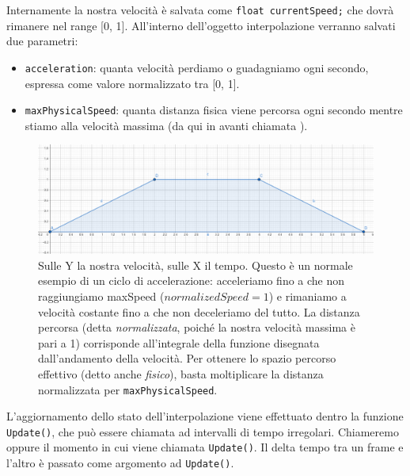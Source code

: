 \documentclass[main.tex]{subfiles}
\begin{document}
Internamente la nostra velocità è salvata come \lstinline{float currentSpeed;} che dovrà rimanere nel range [0, 1]. All'interno dell'oggetto interpolazione verranno salvati due parametri:
\begin{itemize}
    \item \lstinline{acceleration}: quanta velocità perdiamo o guadagniamo ogni secondo, espressa come valore normalizzato tra [0, 1].
    \item \lstinline{maxPhysicalSpeed}: quanta distanza fisica viene percorsa ogni secondo mentre stiamo alla velocità massima (da qui in avanti chiamata ).
\end{itemize}
\begin{figure}[H]
    \centering
    \includegraphics[width=1\linewidth]{img/interpolazione/normalSpeed.png}
    \caption{Sulle Y la nostra velocità, sulle X il tempo. Questo è un normale esempio di un ciclo di accelerazione: acceleriamo fino a che non raggiungiamo maxSpeed ($normalizedSpeed = 1$) e rimaniamo a velocità costante fino a che non deceleriamo del tutto. La distanza percorsa (detta \textit{normalizzata}, poiché la nostra velocità
     massima è pari a 1) corrisponde all'integrale della funzione disegnata dall'andamento della velocità. Per ottenere lo spazio percorso effettivo (detto anche \textit{fisico}), basta moltiplicare la distanza normalizzata per \lstinline{maxPhysicalSpeed}.}
    \label{fig:4_normalSpeed}
\end{figure}

\noindent L'aggiornamento dello stato dell'interpolazione viene effettuato dentro la funzione \lstinline{Update()}, che può essere chiamata ad intervalli di tempo irregolari. Chiameremo  oppure  il momento in cui viene chiamata \lstinline{Update()}. Il delta tempo tra un frame e l'altro è passato come argomento ad \lstinline{Update()}.
\end{document}
